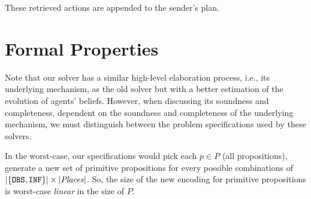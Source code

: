 \documentclass[letterpaper]{article} %
\begin{document}

These retrieved actions are appended to the sender's plan.





\section{Formal Properties}
Note that our solver has a similar high-level elaboration process, i.e., its underlying mechanism, as the old solver but with a better estimation of the evolution of agents' beliefs.  
However, when discussing its soundness and completeness, dependent on the soundness and completeness of the underlying mechanism, we must distinguish between the problem specifications used by these solvers. 

In the worst-case, our specifications would pick each $p \in P$ (all propositions), generate a new set of primitive propositions for every possible combinations of $|\{\texttt{OBS},\texttt{INF}\}| \times |\mathit{Places}|$. 
So, the size of the new encoding for primitive propositions is worst-case \textit{linear} in the size of $P$.
\end{document}
